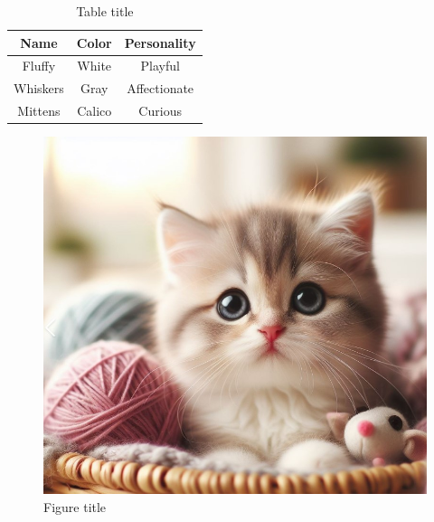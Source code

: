 \documentclass{article}
\begin{document}
\begin{table}
	\centering
	\begin{tabular}{|c|c|c|} \hline
		Name & Color & Personality \\ \hline
		Fluffy & White & Playful \\ \hline
		Whiskers & Gray & Affectionate \\ \hline
		Mittens & Calico & Curious \\ \hline
	\end{tabular}
	\caption{Table title}
	\label{table label}
\end{table}

\begin{figure}
	\centering
	\includegraphics[width=0.5\linewidth]{data/kitty.jpg}
	\caption{Figure title}
	\label{image label}
\end{figure}
\end{document}
